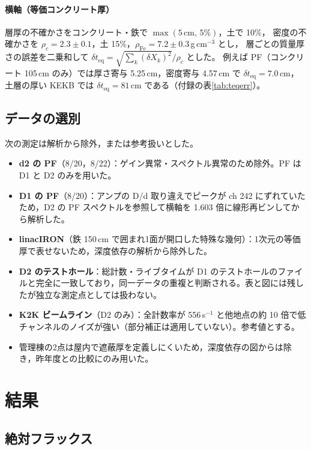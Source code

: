\documentclass[a4paper,11pt]{ltjsarticle}
\newcommand{\teq}{t_{\mathrm{eq}}}
\begin{document}
\paragraph{横軸（等価コンクリート厚）}
層厚の不確かさをコンクリート・鉄で $\max(5\,\mathrm{cm},\,5\%)$，土で 10\%，
密度の不確かさを $\rho_c=2.3\pm0.1$，土 15\%，$\rho_{\mathrm{Fe}}=7.2\pm0.3$\,g\,cm$^{-3}$ とし，
層ごとの質量厚さの誤差を二乗和して $\delta\teq=\sqrt{\sum_k(\delta X_k)^2}/\rho_c$ とした。
例えば PF（コンクリート 105\,cm のみ）では厚さ寄与 5.25\,cm，密度寄与 4.57\,cm で $\delta\teq=7.0$\,cm，
土層の厚い KEKB では $\delta\teq=81$\,cm である（付録の表\ref{tab:teqerr}）。

\subsection{データの選別}
\label{sec:quality}

次の測定は解析から除外，または参考扱いとした。
\begin{itemize}
  \item \textbf{d2 の PF}（8/20，8/22）：ゲイン異常・スペクトル異常のため除外。PF は D1 と D2 のみを用いた。
  \item \textbf{D1 の PF}（8/20）：アンプの D/d 取り違えでピークが ch 242 にずれていたため，D2 の PF スペクトルを参照して横軸を 1.603 倍に線形再ビンしてから解析した。
  \item \textbf{linacIRON}（鉄 150\,cm で囲まれ1面が開口した特殊な幾何）：1次元の等価厚で表せないため，深度依存の解析から除外した。
  \item \textbf{D2 のテストホール}：総計数・ライブタイムが D1 のテストホールのファイルと完全に一致しており，同一データの重複と判断される。表と図には残したが独立な測定点としては扱わない。
  \item \textbf{K2K ビームライン}（D2 のみ）：全計数率が 556\,s$^{-1}$ と他地点の約 10 倍で低チャンネルのノイズが強い（部分補正は適用していない）。参考値とする。
  \item 管理棟の2点は屋内で遮蔽厚を定義しにくいため，深度依存の図からは除き，昨年度との比較にのみ用いた。
\end{itemize}

\section{結果}

\subsection{絶対フラックス}
\end{document}
